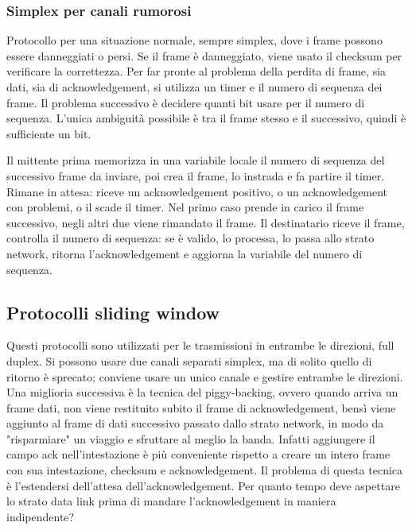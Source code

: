 \subsubsection{Simplex per canali rumorosi}
Protocollo per una situazione normale, sempre simplex, dove i frame possono essere danneggiati o persi.
Se il frame è danneggiato, viene usato il checksum per verificare la correttezza.
Per far pronte al problema della perdita di frame, sia dati, sia di acknowledgement, si utilizza un timer e il numero di sequenza dei frame.
Il problema successivo è decidere quanti bit usare per il numero di sequenza.
L'unica ambiguità possibile è tra il frame stesso e il successivo, quindi è sufficiente un bit.

Il mittente prima memorizza in una variabile locale il numero di sequenza del successivo frame da inviare, poi crea il frame, lo instrada e fa partire il timer.
Rimane in attesa: riceve un acknowledgement positivo, o un acknowledgement con problemi, o il scade il timer.
Nel primo caso prende in carico il frame successivo, negli altri due viene rimandato il frame.
Il destinatario riceve il frame, controlla il numero di sequenza: 
se è valido, lo processa, lo passa allo strato network, ritorna l'acknowledgement e aggiorna la variabile del numero di sequenza.

\subsection{Protocolli sliding window} %
Questi protocolli sono utilizzati per le trasmissioni in entrambe le direzioni, full duplex.
Si possono usare due canali separati simplex, ma di solito quello di ritorno è sprecato; conviene usare un unico canale e gestire entrambe le direzioni.
Una miglioria successiva è la tecnica del piggy-backing, ovvero quando arriva un frame dati, non viene restituito subito il frame di acknowledgement, 
bensì viene aggiunto al frame di dati successivo passato dallo strato network, in modo da "risparmiare" un viaggio e sfruttare al meglio la banda.
Infatti aggiungere il campo ack nell'intestazione è più conveniente rispetto a creare un intero frame con sua intestazione, checksum e acknowledgement.
Il problema di questa tecnica è l'estendersi dell'attesa dell'acknowledgement.
Per quanto tempo deve aspettare lo strato data link prima di mandare l'acknowledgement in maniera indipendente?

